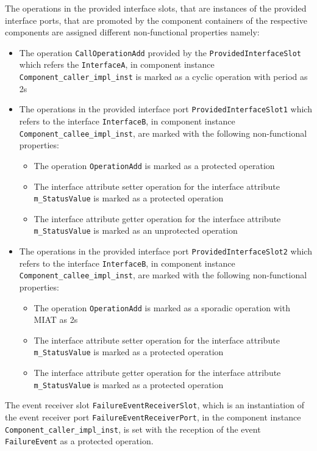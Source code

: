 \begin{description}
The operations in the provided interface slots, that are instances of the provided interface ports, that are promoted by the component containers of the respective components are assigned different non-functional properties namely: 
\begin{itemize}
\item The operation \texttt{CallOperationAdd} provided by the \texttt{ProvidedInterface\allowbreak Slot} which refers the \texttt{InterfaceA}, in component instance \texttt{Component\allowbreak\_caller\_impl\_inst} is marked as a cyclic operation with period as 2s
\item The operations in the provided interface port \texttt{ProvidedInterface\allowbreak Slot1} which refers to the interface \texttt{InterfaceB}, in component instance \texttt{Component\allowbreak\_callee\_impl\_inst}, are marked with the following non-functional properties:
\begin{itemize}
\item The operation \texttt{OperationAdd} is marked as a protected operation
\item The interface attribute setter operation for the interface attribute \texttt{m\_StatusValue} is marked as a protected operation
\item The interface attribute getter operation for the interface attribute \texttt{m\_StatusValue} is marked as an unprotected operation
\end{itemize}
\item The operations in the provided interface port \texttt{ProvidedInterface\allowbreak Slot2} which refers to the interface \texttt{InterfaceB}, in component instance \texttt{Component\allowbreak\_callee\_impl\_inst}, are marked with the following non-functional properties: 
\begin{itemize}
\item The operation \texttt{OperationAdd} is marked as a sporadic operation with MIAT as 2s
\item The interface attribute setter operation for the interface attribute \texttt{m\_StatusValue} is marked as a protected operation
\item The interface attribute getter operation for the interface attribute \texttt{m\_StatusValue} is marked as a protected operation
\end{itemize}
\end{itemize}

The event receiver slot \texttt{FailureEvent\allowbreak ReceiverSlot}, which is an instantiation of the event receiver port \texttt{FailureEvent\allowbreak ReceiverPort}, in the component instance \texttt{Component\allowbreak\_caller\_impl\_inst}, is set with the reception of the event \texttt{FailureEvent} as a protected operation.


\end{description}
